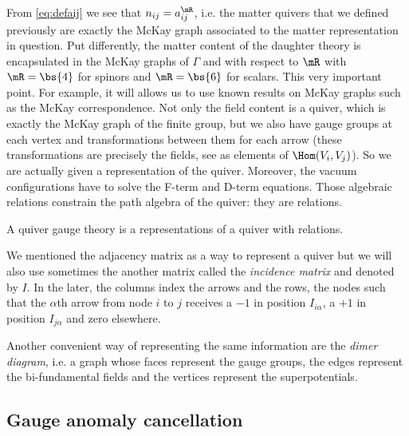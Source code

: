 \documentclass{worksheetclass}
\begin{document}
            From \eqref{eq:defaij} we see that $n_{ij}=a^{\mR}_{ij}$, i.e. the matter quivers that we defined previously are exactly the McKay graph associated to the matter representation in question. Put differently, the matter content of the daughter theory is encapsulated in the McKay graphs of $\Gamma$ and with respect to $\mR$ with $\mR=\bs{4}$ for spinors and $\mR=\bs{6}$ for scalars. This very important point. For example, it will allows us to use known results on McKay graphs such as the McKay correspondence. Not only the field content is a quiver, which is exactly the McKay graph of the finite group, but we also have gauge groups at each vertex and transformations between them for each arrow (these transformations are precisely the fields, see as elements of $\Hom(V_i,V_j)$). So we are actually given a representation of the quiver. Moreover, the vacuum configurations have to solve the F-term and D-term equations. Those algebraic relations constrain the path algebra of the quiver: they are relations.
            \begin{result}
                A quiver gauge theory is a representations of a quiver with relations.
            \end{result}

            We mentioned the adjacency matrix as a way to represent a quiver but we will also use sometimes the another matrix called the \emph{incidence matrix} and denoted by $I$. In the later, the columns index the arrows and the rows, the nodes such that the $\alpha$th arrow from node $i$ to $j$ receives a $-1$ in position $I_{i\alpha}$, a $+1$ in position $I_{j\alpha}$ and zero elsewhere.

            Another convenient way of representing the same information are the \emph{dimer diagram}, i.e. a graph whose faces represent the gauge groups, the edges represent the bi-fundamental fields and the vertices represent the superpotentials.

    \subsection{Gauge anomaly cancellation}
\end{document}
